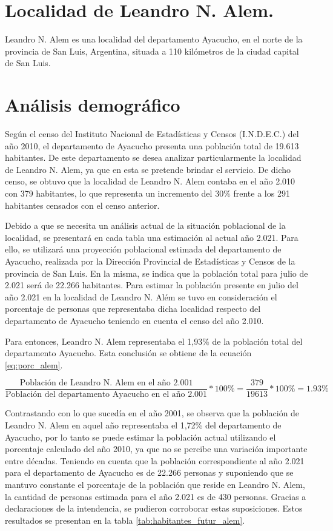 \documentclass[11pt,a4paper]{article}
\begin{document}
\section{Localidad de Leandro N. Alem.}

Leandro N. Alem es una localidad del departamento Ayacucho, en el norte de la provincia de San Luis, Argentina, situada a 110 kilómetros de la ciudad capital de San Luis.


\section{Análisis demográfico}
Según el censo del Instituto Nacional de Estadísticas y Censos (I.N.D.E.C.) del año 2010, el departamento de Ayacucho presenta una población total de 19.613 habitantes. De este departamento se desea analizar particularmente la localidad de Leandro N. Alem, ya que en esta se pretende brindar el servicio. De dicho censo, se obtuvo que la localidad de Leandro N. Alem contaba en el año 2.010 con 379 habitantes, lo que representa un incremento del 30$\%$ frente a los 291 habitantes censados con el censo anterior.

Debido a que se necesita un análisis actual de la situación poblacional de la localidad, se presentará en cada tabla una estimación al actual año 2.021. Para ello, se utilizará una proyección poblacional estimada del departamento de Ayacucho, realizada por la Dirección Provincial de Estadísticas y Censos de la provincia de San Luis. En la misma, se indica que la población total para julio de 2.021 será de 22.266 habitantes. Para estimar la población presente en julio del año 2.021 en la localidad de Leandro N. Além se tuvo en consideración el porcentaje de personas que representaba dicha localidad respecto del departamento de Ayacucho teniendo en cuenta el censo del año 2.010.

Para entonces, Leandro N. Alem representaba el 1,93$\%$ de la población total del departamento Ayacucho. Esta conclusión se obtiene de la ecuación \ref{eq:porc_alem}.

\begin{equation}
    \frac{\text{Población de Leandro N. Alem en el año 2.001}}{\text{Población del departamento Ayacucho en el año 2.001}}*100\%=\frac{379}{19613}*100\%=1.93\%
    \label{eq:porc_alem}
\end{equation}

Contrastando con lo que sucedía en el año 2001, se observa que la población de Leandro N. Alem en aquel año representaba el 1,72\% del departamento de Ayacucho,
por lo tanto se puede estimar la población actual utilizando el porcentaje calculado del año 2010, ya que no se percibe una variación importante entre décadas. 
Teniendo en cuenta que la población correspondiente al año 2.021 para el departamento de Ayacucho es de 22.266 personas y suponiendo que se mantuvo constante el porcentaje de la población que reside en Leandro N. Alem, la cantidad de personas estimada para el año 2.021 es de 430 personas. 
Gracias a declaraciones de la intendencia, se pudieron corroborar estas suposiciones. 
Estos resultados se presentan en la tabla \ref{tab:habitantes_futur_alem}.
\end{document}
